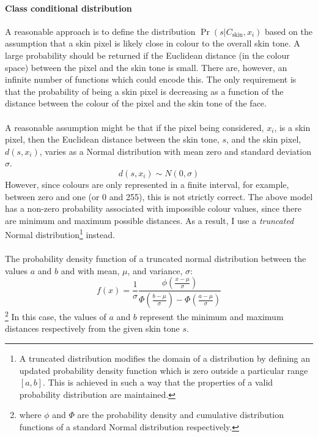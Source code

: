 \paragraph{Class conditional distribution}
A reasonable approach is to define the distribution $\Pr(s|C_\mathrm{skin}, x_i)$ based on the assumption that a skin pixel is likely close in colour to the overall skin tone. A large probability should be returned if the Euclidean distance (in the colour space) between the pixel and the skin tone is small.
There are, however, an infinite number of functions which could encode this. The only requirement is that the probability of being a skin pixel is decreasing as a function of the distance between the colour of the pixel and the skin tone of the face. 
\\\\
A reasonable assumption might be that if the pixel being considered, $x_i$, is a skin pixel, then the Euclidean distance between the skin tone, $s$, and the skin pixel, $d(s,x_i)$, varies as a Normal distribution with mean zero and standard deviation $\sigma$.
\begin{equation*}
   d(s, x_i) \sim N(0, \sigma) 
\end{equation*}
However, since colours are only represented in a finite interval, for example, between zero and one (or 0 and 255), this is not strictly correct. 
The above model has a non-zero probability associated with impossible colour values, since there are minimum and maximum possible distances.
As a result, I use a \textit{truncated} Normal distribution\footnote{A truncated distribution modifies the domain of a distribution by defining an updated probability density function which is zero outside a particular range $[a,b]$. This is achieved in such a way that the properties of a valid probability distribution are maintained.} instead.
\\\\
The probability density function of a truncated normal distribution between the values $a$ and $b$ and with mean, $\mu$, and variance, $\sigma$: 
\begin{equation*}
    f(x) = \frac{1}{\sigma}\frac{\phi(\frac{x-\mu}{\sigma})}{\Phi(\frac{b-\mu}{\sigma}) - \Phi(\frac{a-\mu}{\sigma})}
\end{equation*}\footnote{where $\phi$ and $\Phi$ are the probability density and cumulative distribution functions of a standard Normal distribution respectively.}
\noindent
In this case, the values of $a$ and $b$ represent the minimum and maximum distances respectively from the given skin tone $s$. 
